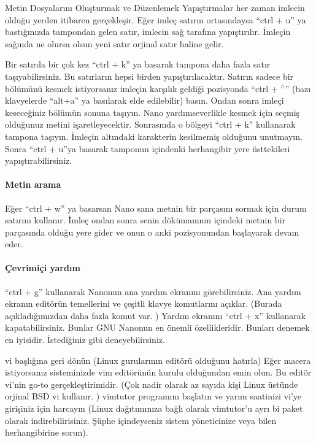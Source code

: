 \begin{section}{Metin Dosyalarını Oluşturmak ve Düzenlemek}
Yapıştırmalar her zaman imlecin olduğu yerden itibaren gerçekleşir. Eğer imleç satırın ortasındaysa “ctrl + u” ya bastığınızda tampondan gelen satır, imlecin sağ tarafına yapıştırılır. İmleçin sağında ne olursa olsun yeni satır orjinal satır haline gelir. 

Bir satırda bir çok kez “ctrl + k” ya basarak tampona daha fazla satır taşıyabilirsiniz. Bu satırların hepsi birden yapıştırılacaktır.
Satırın sadece bir bölümünü kesmek istiyorsanız imleçin karşılık geldiği pozisyonda “ctrl + $ ^\wedge $” (bazı klavyelerde “alt+a” ya basılarak elde edilebilir) basın. Ondan sonra imleçi keseceğiniz bölümün sonuna taşıyın. Nano yardımseverlikle kesmek için seçmiş olduğunuz metini işaretleyecektir. Sonrasında o bölgeyi “ctrl + k” kullanarak tampona taşıyın. İmleçin altındaki karakterin kesilmemiş olduğunu unutmayın. Sonra “ctrl + u”ya basarak tamponun içindenki herhangibir yere üsttekileri yapıştırabilirsiniz. 

\paragraph{Metin arama}{Eğer “ctrl + w” ya basarsan Nano sana metnin bir parçasını sormak için durum satırını kullanır. İmleç ondan sonra senin dökümanının içindeki metnin bir parçasında olduğu yere gider ve onun o anki pozisyonundan başlayarak devam eder.}

\paragraph{Çevrimiçi yardım}{“ctrl + g” kullanarak Nanonun ana yardım ekranını görebilirsiniz. Ana yardım ekranın editörün temellerini ve çeşitli klavye komutlarını açıklar. (Burada açıkladığımızdan daha fazla komut var. ) Yardım ekranını “ctrl + x” kullanarak kapatabilirsiniz.
Bunlar GNU Nanonun en önemli özellikleridir. Bunları denemek en iyisidir. İstediğiniz gibi deneyebilirsiniz.}

vi başlığına geri dönün (Linux gurularının editörü olduğunu hatırla) Eğer macera istiyorsanız sisteminizde vim editörünün kurulu olduğundan emin olun. Bu editör vi’nin go-to gerçekleştirimidir. (Çok nadir olarak az sayıda kişi Linux üstünde orjinal BSD vi kullanır. ) vimtutor programını başlatın ve yarım saatinizi vi’ye girişiniz için harcayın (Linux dağıtımınıza bağlı olarak vimtutor’u ayrı bi paket olarak indirebilirisiniz. Şüphe içindeyseniz sistem yöneticinize veya bilen herhangibirine sorun).


\end{section}
